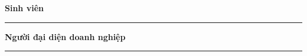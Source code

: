 \vspace{1cm}

\begin{center}
\begin{minipage}[t]{0.4\textwidth}
    \centering
    \textbf{Sinh viên}\\[0.2cm]

    \vspace{2.5cm}

    \rule{0.8\linewidth}{0.4pt}
\end{minipage}
\hfill
\begin{minipage}[t]{0.4\textwidth}
    \centering
    \textbf{Người đại diện doanh nghiệp}\\[0.2cm]

    \vspace{2.5cm}

    \rule{0.8\linewidth}{0.4pt}
\end{minipage}
\end{center}